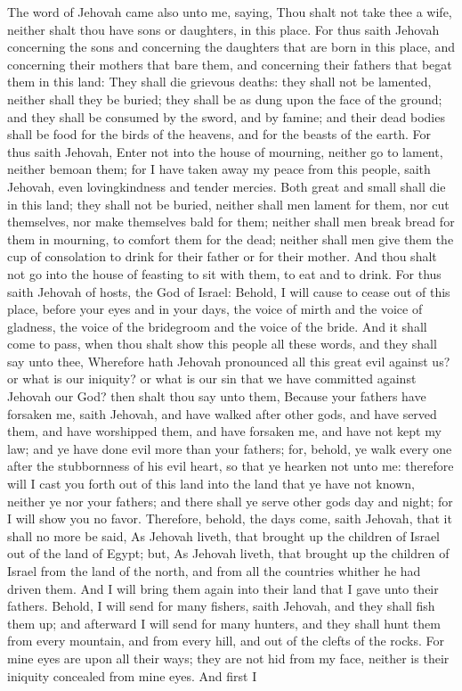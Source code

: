 The word of Jehovah came also unto me, saying, Thou shalt not take thee a wife, neither shalt thou have sons or daughters, in this place. For thus saith Jehovah concerning the sons and concerning the daughters that are born in this place, and concerning their mothers that bare them, and concerning their fathers that begat them in this land: They shall die grievous deaths: they shall not be lamented, neither shall they be buried; they shall be as dung upon the face of the ground; and they shall be consumed by the sword, and by famine; and their dead bodies shall be food for the birds of the heavens, and for the beasts of the earth.  For thus saith Jehovah, Enter not into the house of mourning, neither go to lament, neither bemoan them; for I have taken away my peace from this people, saith Jehovah, even lovingkindness and tender mercies. Both great and small shall die in this land; they shall not be buried, neither shall men lament for them, nor cut themselves, nor make themselves bald for them; neither shall men break bread for them in mourning, to comfort them for the dead; neither shall men give them the cup of consolation to drink for their father or for their mother. And thou shalt not go into the house of feasting to sit with them, to eat and to drink. For thus saith Jehovah of hosts, the God of Israel: Behold, I will cause to cease out of this place, before your eyes and in your days, the voice of mirth and the voice of gladness, the voice of the bridegroom and the voice of the bride.  And it shall come to pass, when thou shalt show this people all these words, and they shall say unto thee, Wherefore hath Jehovah pronounced all this great evil against us? or what is our iniquity? or what is our sin that we have committed against Jehovah our God? then shalt thou say unto them, Because your fathers have forsaken me, saith Jehovah, and have walked after other gods, and have served them, and have worshipped them, and have forsaken me, and have not kept my law; and ye have done evil more than your fathers; for, behold, ye walk every one after the stubbornness of his evil heart, so that ye hearken not unto me: therefore will I cast you forth out of this land into the land that ye have not known, neither ye nor your fathers; and there shall ye serve other gods day and night; for I will show you no favor.  Therefore, behold, the days come, saith Jehovah, that it shall no more be said, As Jehovah liveth, that brought up the children of Israel out of the land of Egypt; but, As Jehovah liveth, that brought up the children of Israel from the land of the north, and from all the countries whither he had driven them. And I will bring them again into their land that I gave unto their fathers.  Behold, I will send for many fishers, saith Jehovah, and they shall fish them up; and afterward I will send for many hunters, and they shall hunt them from every mountain, and from every hill, and out of the clefts of the rocks. For mine eyes are upon all their ways; they are not hid from my face, neither is their iniquity concealed from mine eyes. And first I 